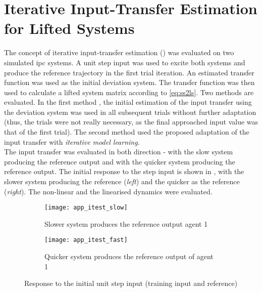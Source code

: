 \chapter{Iterative Input-Transfer Estimation for Lifted Systems}\label{ch:app_iterative_input_transfer}
\graphicspath{{./Bilder/appendix/iterative_estimation}} 

The concept of iterative input-transfer estimation () was evaluated on two simulated \gls{ipc} systems. A unit step input was used to excite both systems and produce the reference trajectory in the first trial iteration. An estimated transfer function was used as the initial deviation system. The transfer function was then used to calculate a lifted system matrix according to \eqref{eq:ss2ls}. Two methods are evaluated. In the first method , the initial estimation of the input transfer using the deviation system was used in all subsequent trials without further adaptation (thus, the trials were not really necessary, as the final approached input value was that of the first trial). The second method  used the proposed adaptation of the input transfer with \textit{iterative model learning}.\\
The input transfer was evaluated in both direction - with the slow system producing the reference output and with the quicker system producing the reference output. The initial response to the step input is shown in , with the slower system producing the reference (\textit{left}) and the quicker as the reference (\textit{right}). The non-linear and the linearised dynamics were evaluated.

\begin{figure}
    \centering
    \begin{subfigure}[t]{0.495\textwidth}
        \centering
        \texttt{[image: app\_itest\_slow]}
        \caption{Slower system produces the reference output agent 1}
    \end{subfigure}
    \hfill
    \begin{subfigure}[t]{0.495\textwidth}
        \centering
        \texttt{[image: app\_itest\_fast]}
        \caption{Quicker system produces the reference output of agent 1}
    \end{subfigure}
    \caption[Iterative Estimation -- Initial Input and Reference]{Response to the initial unit step input (training input and reference)}
    \label{fig:app_itest_step}
\end{figure}


